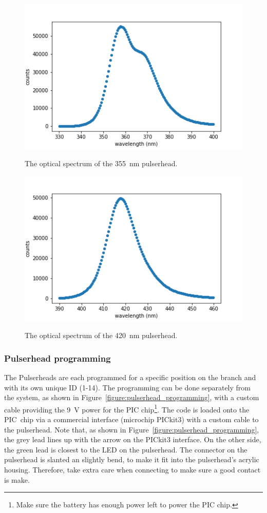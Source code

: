 \begin{figure}
\begin{center}	
  \includegraphics[width=0.60\linewidth]{figures/led_uv.png}
  \caption{The optical spectrum of the 355~nm pulserhead.}
  \label{figure:355nmspec}
  \includegraphics[width=0.60\linewidth]{figures/led_blue.png}
  \caption{The optical spectrum of the 420~nm pulserhead.}
  \label{figure:420nmspec}
\end{center}
\end{figure}

%
%
\subsubsection*{Pulserhead programming}

The Pulserheads are each programmed for a specific position on the branch and with its own unique ID (1-14). The programming can be done separately from the system, as shown in Figure~\ref{figure:pulserhead_programming}, with a custom cable providing the 9~V power for the PIC chip\footnote{Make sure the battery has enough power left to power the PIC chip.}. The code is loaded onto the PIC~chip via a commercial interface (microchip PICkit3) with a custom cable to the pulserhead. Note that, as shown in Figure~\ref{figure:pulserhead_programming}, the grey lead lines up with the arrow on the PICkit3 interface. On the other side, the green lead is closest to the LED on the pulserhead. The connector on the pulserhead is slanted an slightly bend, to make it fit into the pulserhead's acrylic housing. Therefore, take extra care when connecting to make sure a good contact is make.

